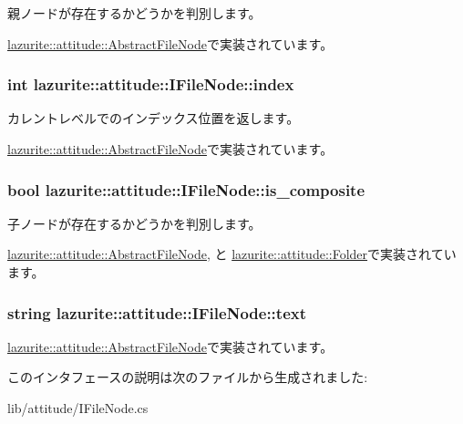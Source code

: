 親ノードが存在するかどうかを判別します。 

\hyperlink{classlazurite_1_1attitude_1_1_abstract_file_node_ae05845cbaf865f736f7ab086c2917c37}{lazurite::attitude::AbstractFileNode}で実装されています。\hypertarget{interfacelazurite_1_1attitude_1_1_i_file_node_a12c90a434a3bbbc7aa33998855d267d1}{
\subsubsection[{index}]{\setlength{\rightskip}{0pt plus 5cm}int lazurite::attitude::IFileNode::index}}
\label{interfacelazurite_1_1attitude_1_1_i_file_node_a12c90a434a3bbbc7aa33998855d267d1}


カレントレベルでのインデックス位置を返します。 

\hyperlink{classlazurite_1_1attitude_1_1_abstract_file_node_aa577939aa3338fcc7ddb7a8b916bfce3}{lazurite::attitude::AbstractFileNode}で実装されています。\hypertarget{interfacelazurite_1_1attitude_1_1_i_file_node_aef59ad71eae714defca2dc6fb7a03435}{
\subsubsection[{is\_\-composite}]{\setlength{\rightskip}{0pt plus 5cm}bool lazurite::attitude::IFileNode::is\_\-composite}}
\label{interfacelazurite_1_1attitude_1_1_i_file_node_aef59ad71eae714defca2dc6fb7a03435}


子ノードが存在するかどうかを判別します。 

\hyperlink{classlazurite_1_1attitude_1_1_abstract_file_node_aa10f20180663fe19416447c3b3486061}{lazurite::attitude::AbstractFileNode}, と \hyperlink{classlazurite_1_1attitude_1_1_folder_afcfe6dea96b826c40b4b99cf34888b0c}{lazurite::attitude::Folder}で実装されています。\hypertarget{interfacelazurite_1_1attitude_1_1_i_file_node_a7ac4b8574f1527248a33d0e816e080cf}{
\subsubsection[{text}]{\setlength{\rightskip}{0pt plus 5cm}string lazurite::attitude::IFileNode::text}}
\label{interfacelazurite_1_1attitude_1_1_i_file_node_a7ac4b8574f1527248a33d0e816e080cf}


\hyperlink{classlazurite_1_1attitude_1_1_abstract_file_node_aa117dae2818bab77b5215d6307c99aeb}{lazurite::attitude::AbstractFileNode}で実装されています。

このインタフェースの説明は次のファイルから生成されました:\begin{DoxyCompactItemize}
\item 
lib/attitude/IFileNode.cs\end{DoxyCompactItemize}
